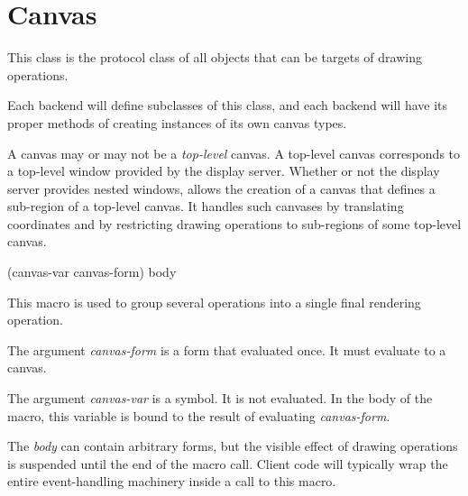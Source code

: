 \chapter{Canvas}
\label{chap-canvas}


This class is the protocol class of all objects that can be targets of
drawing operations.

Each backend will define subclasses of this class, and each backend
will have its proper methods of creating instances of its own canvas
types.

A canvas may or may not be a \emph{top-level} canvas.  A top-level
canvas corresponds to a top-level window provided by the display
server.  Whether or not the display server provides nested windows,
\sysname{} allows the creation of a canvas that defines a sub-region
of a top-level canvas.  It handles such canvases by translating
coordinates and by restricting drawing operations to sub-regions of
some top-level canvas.

 {(canvas-var canvas-form) \body body}

This macro is used to group several operations into a single final
rendering operation.

The argument \textit{canvas-form} is a form that evaluated once.  It
must evaluate to a canvas.

The argument \textit{canvas-var} is a symbol.  It is not evaluated.
In the body of the macro, this variable is bound to the result of
evaluating \textit{canvas-form}.

The \textit{body} can contain arbitrary forms, but the visible effect
of drawing operations is suspended until the end of the macro call.
Client code will typically wrap the entire event-handling machinery
inside a call to this macro.
